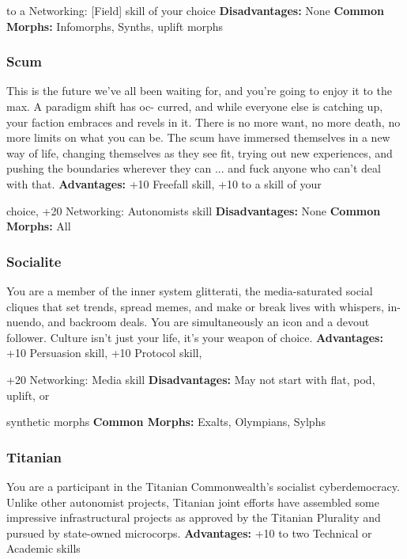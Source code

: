 to a Networking: [Field] skill of your choice
\textbf{Disadvantages:} None
\textbf{Common Morphs:} Infomorphs, Synths, uplift morphs

\subsubsection{Scum}

This is the future we've all been waiting for, and you're 
going to enjoy it to the max. A paradigm shift has oc-
curred, and while everyone else is catching up, your 
faction embraces and revels in it. There is no more 
want, no more death, no more limits on what you can 
be. The scum have immersed themselves in a new way 
of life, changing themselves as they see fit, trying out 
new experiences, and pushing the boundaries wherever 
they can ... and fuck anyone who can't deal with that.
\textbf{Advantages:} +10 Freefall skill, +10 to a skill of your 

choice, +20 Networking: Autonomists skill
\textbf{Disadvantages:} None
\textbf{Common Morphs:} All

\subsubsection{Socialite}

You are a member of the inner system glitterati, the 
media-saturated social cliques that set trends, spread 
memes, and make or break lives with whispers, in-
nuendo, and backroom deals. You are simultaneously 
an icon and a devout follower. Culture isn't just your 
life, it's your weapon of choice.
\textbf{Advantages:} +10 Persuasion skill, +10 Protocol skill, 

+20 Networking: Media skill
\textbf{Disadvantages:} May not start with flat, pod, uplift, or 

synthetic morphs
\textbf{Common Morphs:} Exalts, Olympians, Sylphs

\subsubsection{Titanian}

You are a participant in the Titanian Commonwealth's 
socialist cyberdemocracy. Unlike other autonomist 
projects, Titanian joint efforts have assembled some 
impressive infrastructural projects as approved by 
the Titanian Plurality and pursued by state-owned 
microcorps.
\textbf{Advantages:} +10 to two Technical or Academic skills 

